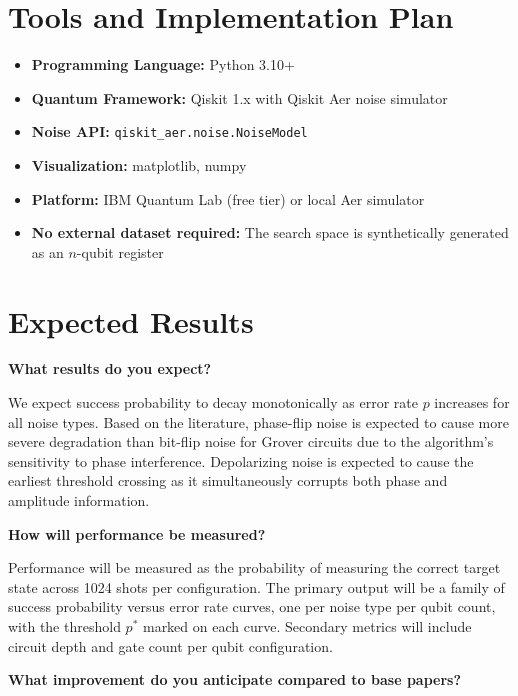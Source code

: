 \documentclass[12pt, a4paper]{article}
\begin{document}
\section{Tools and Implementation Plan}

\begin{itemize}
  \item \textbf{Programming Language:} Python 3.10+
  \item \textbf{Quantum Framework:} Qiskit 1.x with Qiskit Aer noise simulator
  \item \textbf{Noise API:} \texttt{qiskit\_aer.noise.NoiseModel}
  \item \textbf{Visualization:} matplotlib, numpy
  \item \textbf{Platform:} IBM Quantum Lab (free tier) or local Aer simulator
  \item \textbf{No external dataset required:} The search space is synthetically
        generated as an $n$-qubit register
\end{itemize}

\section{Expected Results}

\textbf{What results do you expect?}

We expect success probability to decay monotonically as error rate $p$ increases
for all noise types. Based on the literature, phase-flip noise is expected to cause
more severe degradation than bit-flip noise for Grover circuits due to the
algorithm's sensitivity to phase interference. Depolarizing noise is expected to
cause the earliest threshold crossing as it simultaneously corrupts both phase and
amplitude information.

\textbf{How will performance be measured?}

Performance will be measured as the probability of measuring the correct target
state across 1024 shots per configuration. The primary output will be a family of
success probability versus error rate curves, one per noise type per qubit count,
with the threshold $p^{*}$ marked on each curve. Secondary metrics will include
circuit depth and gate count per qubit configuration.

\textbf{What improvement do you anticipate compared to base papers?}
\end{document}
